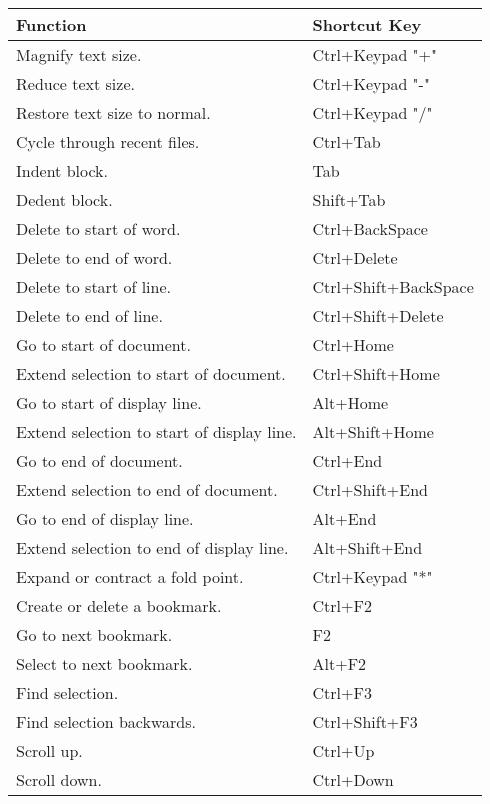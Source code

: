 \begin{tabular}{|l|l|}\hline
Function		                &   Shortcut Key\\ \hline
Magnify text size. 	            &   Ctrl+Keypad "+"\\ \hline
Reduce text size. 	            &   Ctrl+Keypad "-"\\ \hline
Restore text size to normal. 	&   Ctrl+Keypad "/"\\ \hline
Cycle through recent files. 	&   Ctrl+Tab\\ \hline
Indent block. 	                &   Tab\\ \hline
Dedent block. 	                &   Shift+Tab\\ \hline
Delete to start of word. 	    &   Ctrl+BackSpace\\ \hline
Delete to end of word. 	        &   Ctrl+Delete\\ \hline
Delete to start of line. 	    &   Ctrl+Shift+BackSpace\\ \hline
Delete to end of line. 	        &   Ctrl+Shift+Delete\\ \hline
Go to start of document. 	    &   Ctrl+Home\\ \hline
Extend selection to start of document. 	&   Ctrl+Shift+Home\\ \hline
Go to start of display line. 	&   Alt+Home\\ \hline
Extend selection to start of display line. 	&   Alt+Shift+Home\\ \hline
Go to end of document. 	        &   Ctrl+End\\ \hline
Extend selection to end of document. 	&   Ctrl+Shift+End\\ \hline
Go to end of display line. 	    &   Alt+End\\ \hline
Extend selection to end of display line. 	&   Alt+Shift+End\\ \hline
Expand or contract a fold point. 	&   Ctrl+Keypad "*"\\ \hline
Create or delete a bookmark. 	&   Ctrl+F2\\ \hline
Go to next bookmark. 	        &   F2\\ \hline
Select to next bookmark. 	    &   Alt+F2\\ \hline
Find selection. 	            &   Ctrl+F3\\ \hline
Find selection backwards. 	    &   Ctrl+Shift+F3\\ \hline
Scroll up. 	                    &   Ctrl+Up\\ \hline
Scroll down. 	                &   Ctrl+Down\\ \hline

\end{tabular}
